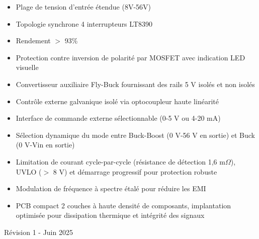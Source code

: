 \begin{titlepage}
\begin{minipage}[t]{0.48\textwidth}
	\begin{itemize}[leftmargin=0pt,labelsep=5pt]
		\item Plage de tension d'entrée étendue (8V-56V)
		\item Topologie synchrone 4 interrupteurs LT8390
		\item Rendement $>$ 93\%
		\item Protection contre inversion de polarité par MOSFET avec indication LED visuelle
		\item Convertisseur auxiliaire Fly-Buck fournissant des rails 5 V isolés et non isolés
		\item Contrôle externe galvanique isolé via optocoupleur haute linéarité
		\item Interface de commande externe sélectionnable (0-5 V ou 4-20 mA)
		\item Sélection dynamique du mode entre Buck-Boost (0 V-56 V en sortie) et Buck (0 V-Vin en sortie)
		\item Limitation de courant cycle-par-cycle (résistance de détection 1,6 m$\Omega$), UVLO ($>$ 8 V) et démarrage progressif pour protection robuste
		\item Modulation de fréquence à spectre étalé pour réduire les EMI
		\item PCB compact 2 couches à haute densité de composants, implantation optimisée pour dissipation thermique et intégrité des signaux
	\end{itemize}
	\end{minipage}


    \vfill

    \noindent
    \begin{minipage}[t]{0.48\textwidth}
      \footnotesize Révision 1 - Juin 2025 \\
    \end{minipage}%
    \hfill%
    \begin{minipage}[t]{0.48\textwidth}
      \raggedleft
    \end{minipage}\\[0.5em]

\end{titlepage}
